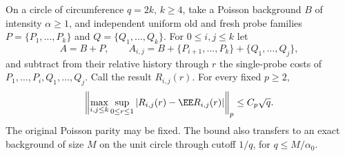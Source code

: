 \documentclass[11pt,letterpaper]{article}
\begin{document}
\begin{lemma}
\label{lem:resampling-prefix-remainder}
On a circle of circumference $q=2k$, $k\ge4$, take a
Poisson background $B$ of intensity $\alpha\ge1$, and
independent uniform old and fresh probe families
$P=\{P_1,\ldots,P_k\}$ and $Q=\{Q_1,\ldots,Q_k\}$.
For $0\le i,j\le k$ let
\[
 A=B+P,\qquad
 A_{i,j}=B+\{P_{i+1},\ldots,P_k\}+\{Q_1,\ldots,Q_j\},
\]
and subtract from their relative history through $r$ the
single-probe costs of $P_1,\ldots,P_i,Q_1,\ldots,Q_j$.
Call the result $R_{i,j}(r)$. For every fixed $p\ge2$,
\begin{equation}\label{eq:resampling-prefix-remainder}
 \left\|\max_{i,j\le k}\sup_{0\le r\le1}
              |R_{i,j}(r)-\EE R_{i,j}(r)|\right\|_p
                                                   \le C_p\sqrt q.
\end{equation}
The original Poisson parity may be fixed.
The bound also transfers to an exact background of size
$M$ on the unit circle through cutoff $1/q$, for
$q\le M/\alpha_0$.
\end{lemma}
\end{document}
